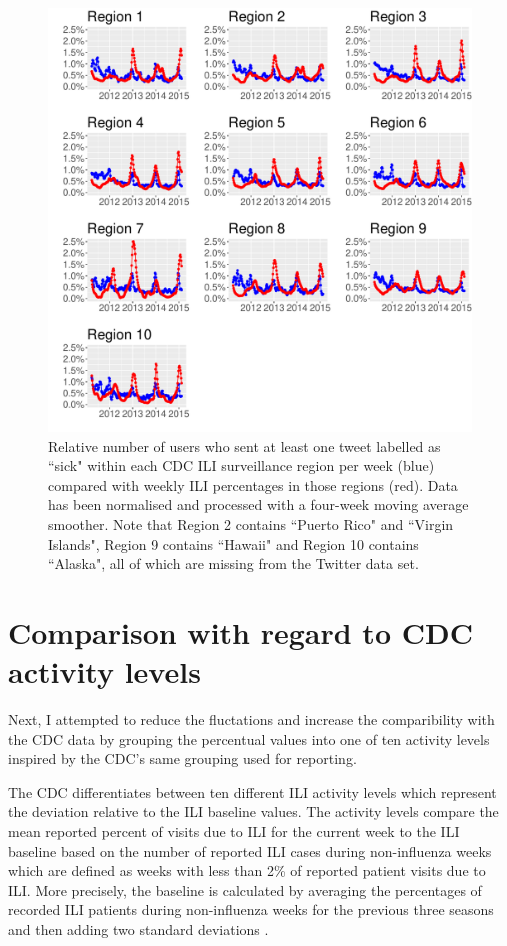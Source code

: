 \documentclass[11pt, a4paper]{report}\usepackage[]{graphicx}\usepackage[]{color}
\begin{document}
\begin{figure}[H]
\centering
\includegraphics[width=1\linewidth]{cdc_twitter_comp_regs_ma4_user.pdf}
\caption{Relative number of users who sent at least one tweet labelled as ``sick" within each CDC ILI surveillance region per week (blue) compared with weekly ILI percentages in those regions (red). Data has been normalised and processed with a four-week moving average smoother. Note that Region 2 contains ``Puerto Rico" and ``Virgin Islands", Region 9 contains ``Hawaii" and Region 10 contains ``Alaska", all of which are missing from the Twitter data set.}
\label{fig:cdc_tw_comp_regs_ma4}
\end{figure}

\section{Comparison with regard to CDC activity levels}
Next, I attempted to reduce the fluctations and increase the comparibility with the CDC data by grouping the percentual values into one of ten activity levels inspired by the CDC's same grouping used for reporting.\newline

The CDC differentiates between ten different ILI activity levels which represent the deviation relative to the ILI baseline values. The activity levels compare the mean reported percent of visits due to ILI for the current week to the ILI baseline based on the number of reported ILI cases during non-influenza weeks which are defined as weeks with less than 2\% of reported patient visits due to ILI. More precisely, the baseline is calculated by averaging the percentages of recorded ILI patients during non-influenza weeks for the previous three seasons and then adding two standard deviations \citep{cdc_surveillance_2016}.
\end{document}
